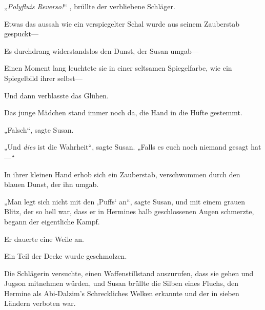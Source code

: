 „\emph{Polyfluis Reverso!}“ , brüllte der verbliebene Schläger.

Etwas das aussah wie ein verspiegelter Schal wurde aus seinem Zauberstab gespuckt—

Es durchdrang widerstandslos den Dunst, der Susan umgab—

Einen Moment lang leuchtete sie in einer seltsamen Spiegelfarbe, wie ein Spiegelbild ihrer selbst—

Und dann verblasste das Glühen.

Das junge Mädchen stand immer noch da, die Hand in die Hüfte gestemmt.

„Falsch“, sagte Susan.

„Und \emph{dies} ist die Wahrheit“, sagte Susan. „Falls es euch noch niemand gesagt hat—“

In ihrer kleinen Hand erhob sich ein Zauberstab, verschwommen durch den blauen Dunst, der ihn umgab.

„Man legt sich nicht mit den ‚Puffs‘ an“, sagte Susan, und mit einem grauen Blitz, der so hell war, dass er in Hermines halb geschlossenen Augen schmerzte, begann der eigentliche Kampf.

Er dauerte eine Weile an.

Ein Teil der Decke wurde geschmolzen.

Die Schlägerin versuchte, einen Waffenstillstand auszurufen, dass sie gehen und Jugson mitnehmen würden, und Susan brüllte die Silben eines Fluchs, den Hermine als Abi-Dalzim’s Schreckliches Welken erkannte und der in sieben Ländern verboten war.

